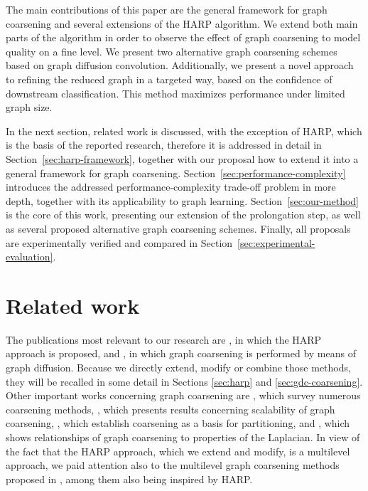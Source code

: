 \documentclass[sn-mathphys,pdflatex,iicol]{sn-jnl}%
\begin{document}
The main contributions of this paper are the general framework for graph coarsening and several extensions of the HARP algorithm. We extend both main parts of the algorithm in order to observe the effect of graph coarsening to model quality on a fine level. We present two alternative graph coarsening schemes based on graph diffusion convolution. Additionally, we present a novel approach to refining the reduced graph in a targeted way, based on the confidence of downstream classification. This method maximizes performance under limited graph size.

In the next section, related work is discussed, with the exception of HARP, which is the basis of the reported research, therefore it is addressed in detail in Section~\ref{sec:harp-framework}, together with our proposal how to extend it into a general framework for graph coarsening. Section~\ref{sec:performance-complexity} introduces the addressed performance-complexity trade-off problem in more depth, together with its applicability to graph learning. Section~\ref{sec:our-method} is the core of this work, presenting our extension of the prolongation step, as well as several proposed alternative graph coarsening schemes. Finally, all proposals are experimentally verified and compared in Section~\ref{sec:experimental-evaluation}.

\section{Related work}

The publications most relevant to our research are \cite{chen_harp_2018}, in which the HARP approach is proposed, and \cite{gasteiger_diffusion_2019}, in which graph coarsening is performed by means of graph diffusion. Because we directly extend, modify or combine those methods, they will be recalled in some detail in Sections \ref{sec:harp} and \ref{sec:gdc-coarsening}. Other important works concerning graph coarsening are \cite{akyildiz_understanding_2020, chen_graph_2022, cai_graph_2022}, which survey numerous coarsening methods, \cite{huang_scaling_2021}, which presents results concerning scalability of graph coarsening, \cite{catalyurek_multithreaded_2012, herrmann_multilevel_2019}, which establish coarsening as a basis for partitioning, and \cite{loukas_graph_2019}, which shows relationships of graph coarsening to properties of the Laplacian. In view of the fact that the HARP approach, which we extend and modify, is a multilevel approach, we paid attention also to the multilevel graph coarsening methods proposed in \cite{bethune_hierarchical_2020, xie_graph_2020, zhang_harp_2021, liu_hierarchical_2021}, among them \cite{zhang_harp_2021} also being inspired by HARP.
\end{document}
